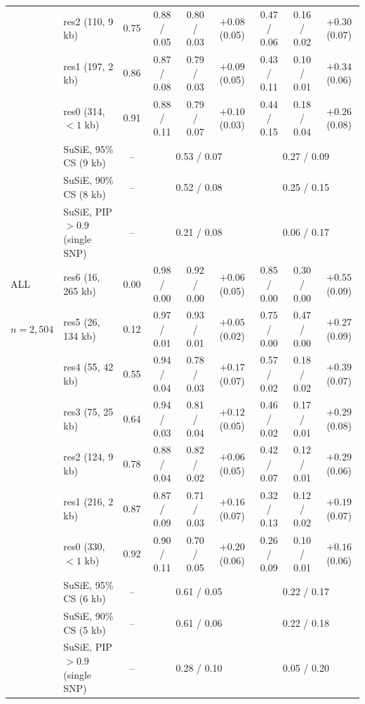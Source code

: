 \begin{tabular}{llccccccc}
 & res2 (110, 9 kb) & 0.75 & 0.88 / 0.05 & 0.80 / 0.03 & $+0.08$ (0.05) & 0.47 / 0.06 & 0.16 / 0.02 & $+0.30$ (0.07)\\
 & res1 (197, 2 kb) & 0.86 & 0.87 / 0.08 & 0.79 / 0.03 & $+0.09$ (0.05) & 0.43 / 0.11 & 0.10 / 0.01 & $+0.34$ (0.06)\\
 & res0 (314, $<1$ kb) & 0.91 & 0.88 / 0.11 & 0.79 / 0.07 & $+0.10$ (0.03) & 0.44 / 0.15 & 0.18 / 0.04 & $+0.26$ (0.08)\\
 & SuSiE, 95\% CS (9 kb) & -- & \multicolumn{3}{c}{0.53 / 0.07} & \multicolumn{3}{c}{0.27 / 0.09}\\
 & SuSiE, 90\% CS (8 kb) & -- & \multicolumn{3}{c}{0.52 / 0.08} & \multicolumn{3}{c}{0.25 / 0.15}\\
 & SuSiE, PIP $>0.9$ (single SNP) & -- & \multicolumn{3}{c}{0.21 / 0.08} & \multicolumn{3}{c}{0.06 / 0.17}\\
\midrule
ALL & res6 (16, 265 kb) & 0.00 & 0.98 / 0.00 & 0.92 / 0.00 & $+0.06$ (0.05) & 0.85 / 0.00 & 0.30 / 0.00 & $+0.55$ (0.09)\\
$n=2{,}504$ & res5 (26, 134 kb) & 0.12 & 0.97 / 0.01 & 0.93 / 0.01 & $+0.05$ (0.02) & 0.75 / 0.00 & 0.47 / 0.00 & $+0.27$ (0.09)\\
 & res4 (55, 42 kb) & 0.55 & 0.94 / 0.04 & 0.78 / 0.03 & $+0.17$ (0.07) & 0.57 / 0.02 & 0.18 / 0.02 & $+0.39$ (0.07)\\
 & res3 (75, 25 kb) & 0.64 & 0.94 / 0.03 & 0.81 / 0.04 & $+0.12$ (0.05) & 0.46 / 0.02 & 0.17 / 0.01 & $+0.29$ (0.08)\\
 & res2 (124, 9 kb) & 0.78 & 0.88 / 0.04 & 0.82 / 0.02 & $+0.06$ (0.05) & 0.42 / 0.07 & 0.12 / 0.01 & $+0.29$ (0.06)\\
 & res1 (216, 2 kb) & 0.87 & 0.87 / 0.09 & 0.71 / 0.03 & $+0.16$ (0.07) & 0.32 / 0.13 & 0.12 / 0.02 & $+0.19$ (0.07)\\
 & res0 (330, $<1$ kb) & 0.92 & 0.90 / 0.11 & 0.70 / 0.05 & $+0.20$ (0.06) & 0.26 / 0.09 & 0.10 / 0.01 & $+0.16$ (0.06)\\
 & SuSiE, 95\% CS (6 kb) & -- & \multicolumn{3}{c}{0.61 / 0.05} & \multicolumn{3}{c}{0.22 / 0.17}\\
 & SuSiE, 90\% CS (5 kb) & -- & \multicolumn{3}{c}{0.61 / 0.06} & \multicolumn{3}{c}{0.22 / 0.18}\\
 & SuSiE, PIP $>0.9$ (single SNP) & -- & \multicolumn{3}{c}{0.28 / 0.10} & \multicolumn{3}{c}{0.05 / 0.20}\\
\bottomrule
\end{tabular}
